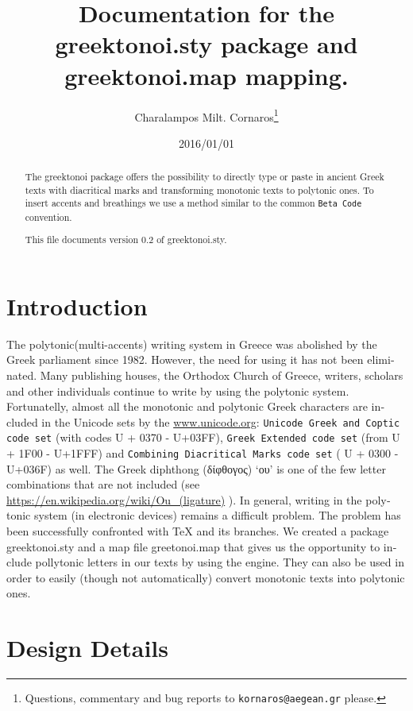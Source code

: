 \documentclass{article}
\title{Documentation for the {\sf greektonoi.sty} package and {\sf greektonoi.map} mapping.}
\author{Charalampos Milt. Cornaros\thanks{ Questions, commentary and bug reports to \texttt{kornaros@aegean.gr} please.}}
\date{2016/01/01}
\begin{document}
\maketitle
\begin{abstract}
The \textsf{greektonoi} package offers the possibility to directly type or paste in ancient Greek texts with diacritical marks and transforming monotonic texts to polytonic ones. To insert accents and breathings we use a method similar to the common \texttt{Beta Code} convention.

This file documents version 0.2 of \textsf{greektonoi.sty}.
\end{abstract}

\tableofcontents

\begin{english}
\section{Introduction}

The polytonic(multi-accents) writing system in Greece was abolished by the Greek parliament since 1982. However, the need for using it  has not been eliminated. Many publishing houses, the  Orthodox Church of Greece, writers, scholars and other individuals continue to write by using  the polytonic system. Fortunatelly,  almost all the monotonic and polytonic  Greek characters are included in the Unicode sets by the \url{www.unicode.org}: \texttt{Unicode Greek and Coptic code set} (with codes  U + 0370 - U+03FF), \texttt{Greek Extended code set} (from U  + 1F00 - U+1FFF)  and \texttt{Combining Diacritical Marks code set} ( U + 0300 - U+036F) as well. The Greek diphthong (δίφθογος) ‘ου’ is one of the few  letter combinations that are not included  (see  \url{https://en.wikipedia.org/wiki/Ou_(ligature)} ). In general, writing in the polytonic system (in electronic devices) remains a difficult problem. The problem has been successfully confronted with \TeX{} and its branches. We created a package {\sf greektonoi.sty } and a map file {\sf greetonoi.map} that gives us the opportunity to include pollytonic letters in our texts by using the \XeTeX{} engine. They can also be used in order to easily (though not automatically) convert monotonic texts into polytonic ones.

\section{Design Details}


\end{english}
\end{document}
